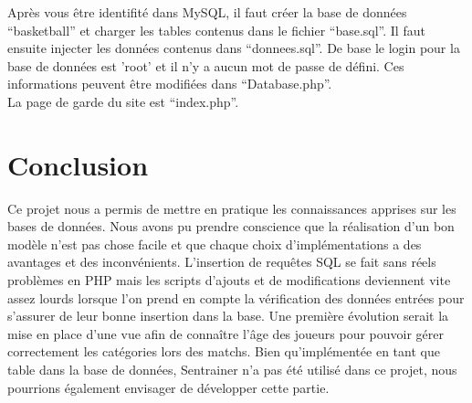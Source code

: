 \documentclass[a4paper,8pt,french,fleqn]{report}
\begin{document}
Après vous être identifité dans MySQL, il faut créer la base de données ``basketball'' et charger les tables contenus dans le fichier ``base.sql''. Il faut ensuite injecter les données contenus dans ``donnees.sql''. De base le login pour la base de données est 'root' et il n'y a aucun mot de passe de défini. Ces informations peuvent être modifiées dans ``Database.php''. \\

La page de garde du site est ``index.php''.

\chapter*{Conclusion}

Ce projet nous a permis de mettre en pratique les connaissances apprises sur les bases de données. Nous avons pu prendre conscience que la réalisation d'un bon modèle n'est pas chose facile et que chaque choix d'implémentations a des avantages et des inconvénients. L'insertion de requêtes SQL se fait sans réels problèmes en PHP mais les scripts d'ajouts et de modifications deviennent vite assez lourds lorsque l'on prend en compte la vérification des données entrées pour s'assurer de leur bonne insertion dans la base. Une première évolution serait la mise en place d'une vue afin de connaître l'âge des joueurs pour pouvoir gérer correctement les catégories lors des matchs. Bien qu'implémentée en tant que table dans la base de données, Sentrainer n'a pas été utilisé dans ce projet, nous pourrions également envisager de développer cette partie.
\end{document}
